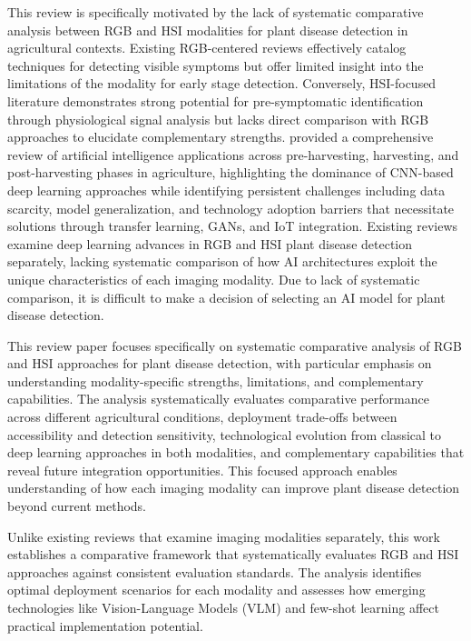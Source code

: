 \documentclass[sn-mathphys]{sn-jnl}
\theoremstyle{thmstyleone}%
\theoremstyle{thmstyletwo}%
\theoremstyle{thmstylethree}%
\begin{document}
This review is specifically motivated by the lack of systematic comparative analysis between RGB and HSI modalities for plant disease detection in agricultural contexts. Existing RGB-centered reviews \citep{bhagat2022comprehensive, sunil2023systematic} effectively catalog techniques for detecting visible symptoms but offer limited insight into the limitations of the modality for early stage detection. Conversely, HSI-focused literature \citep{Yao2023, wang2021review} demonstrates strong potential for pre-symptomatic identification through physiological signal analysis but lacks direct comparison with RGB approaches to elucidate complementary strengths. \citet{upadhyay2025artificial} provided a comprehensive review of artificial intelligence applications across pre-harvesting, harvesting, and post-harvesting phases in agriculture, highlighting the dominance of CNN-based deep learning approaches while identifying persistent challenges including data scarcity, model generalization, and technology adoption barriers that necessitate solutions through transfer learning, GANs, and IoT integration. Existing reviews examine deep learning advances in RGB and HSI plant disease detection separately, lacking systematic comparison of how AI architectures exploit the unique characteristics of each imaging modality. Due to lack of systematic comparison, it is difficult to make a decision of selecting an AI model for plant disease detection.


This review paper focuses specifically on systematic comparative analysis of RGB and HSI approaches for plant disease detection, with particular emphasis on understanding modality-specific strengths, limitations, and complementary capabilities. The analysis systematically evaluates comparative performance across different agricultural conditions, deployment trade-offs between accessibility and detection sensitivity, technological evolution from classical to deep learning approaches in both modalities, and complementary capabilities that reveal future integration opportunities. This focused approach enables understanding of how each imaging modality can improve plant disease detection beyond current methods.

Unlike existing reviews that examine imaging modalities separately, this work establishes a comparative framework that systematically evaluates RGB and HSI approaches against consistent evaluation standards. The analysis identifies optimal deployment scenarios for each modality and assesses how emerging technologies like Vision-Language Models (VLM) and few-shot learning affect practical implementation potential.
\end{document}
